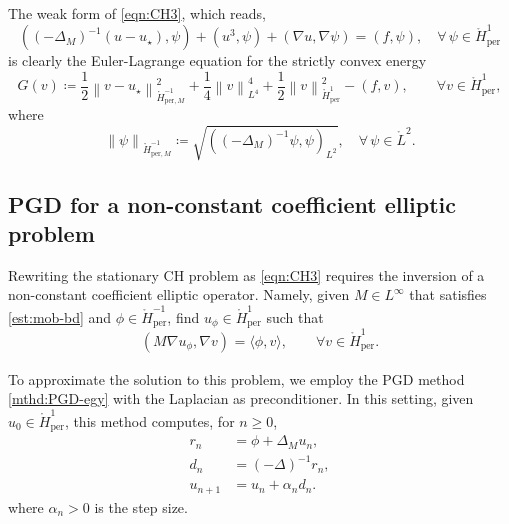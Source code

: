 \documentclass{amsart}
\newcommand{\nrm}[1]{\left\| #1 \right\|}
\newcommand{\polR}{\mathbb R}
\newcommand{\Hm}{{\mathring H_{\mathrm{per}}^{-1}}}
\newcommand{\Homz}{{\mathring{H}_{\mathrm{per}}^{1}}}
\newcommand{\HMm}{{\mathring{H}_{\mathrm{per},M}^{-1}}}
\newcommand{\ins}{{\alpha}} %
\theoremstyle{definition}
\begin{document}
The weak form of \eqref{eqn:CH3}, which reads,
\[
  \left((-\Delta_M)^{-1} (u- u_\star), \psi  \right) + (u^3,\psi) + \left(\nabla u,\nabla\psi  \right) = (f,\psi), \quad  \forall \, \psi\in \Homz
\]
is clearly the Euler-Lagrange equation for the strictly convex energy
\begin{equation}\label{obj:CH-egy}
	G(v) \coloneqq  \frac{1}{2}\nrm{v-u_\star}_{\HMm}^2 + \frac{1}{4}\nrm{v}_{L^4}^4 +\frac{1}{2} \nrm{ v }_{\Homz}^2 - (f,v),
	\qquad 
	\forall v \in \Homz,
\end{equation}
where
\begin{equation}
\label{obj:HMo-ip}
  \nrm{ \psi }_{\HMm} \coloneqq  \sqrt{\left((-\Delta_M)^{-1} \psi,\psi \right)_{L^2}}, \quad \forall \, \psi\in \mathring{L}^2.
\end{equation}


\subsection{PGD for a non-constant coefficient elliptic problem}
\label{sec:PGD-Pois}


Rewriting the stationary CH problem as \eqref{eqn:CH3} requires the inversion of a non-constant coefficient elliptic operator. Namely, given $M\in L^\infty$ that satisfies \eqref{est:mob-bd} and $\phi\in\Hm$, find $u_\phi \in\Homz$ such that
\begin{equation}
	(M\nabla u_\phi, \nabla v)_{} = \langle \phi, v\rangle,  \qquad \forall v\in\Homz.
	\label{eqn:lapm-weak}
\end{equation}

To approximate the solution to this problem, we employ the PGD method \eqref{mthd:PGD-egy} with the Laplacian as preconditioner. In this setting, given $u_0\in\Homz$, this method computes, for $n \ge 0$,
	\begin{align}
	r_n &= \phi + \Delta_M u_{n} ,
	\label{mthd:PGD-Pois-res}
	\\
	d_n &= (-\Delta)^{-1}r_n,
	\label{mthd:PGD-Pois-sd}
	\\
u_{n+1} & = u_{n} + \ins_n d_n .
	\label{mthd:PGD-Pois}
	\end{align}
where $\ins_n>0$ is the step size.
\end{document}
